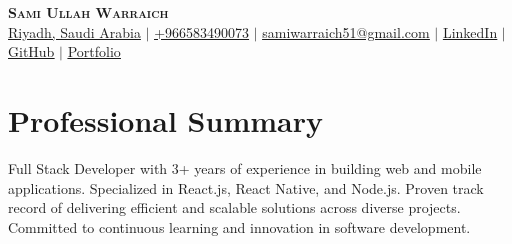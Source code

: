 \documentclass[letterpaper,11pt]{article}
\begin{document}

\begin{center}
    \textbf{\Huge \scshape Sami Ullah Warraich} \\ \vspace{1pt}
    \small 
    {\underline{Riyadh, Saudi Arabia}} $|$ 
    \href{https://wa.me/+966583490073}{\underline{+966583490073}} $|$ 
    \href{mailto:samiwarraich51@gmail.com}{\underline{samiwarraich51@gmail.com}} $|$ 
    \href{https://linkedin.com/in/samiwarra1ch}{\underline{LinkedIn}} $|$
    \href{https://github.com/samiwarraich}{\underline{GitHub}} 
    $|$ \href{https://sami.warraich.co}{\underline{Portfolio}}
\end{center}



\section{Professional Summary}
    \begin{itemize}[leftmargin=0.15in, label={}]
    \small{\item{
     {Full Stack Developer with 3+ years of experience in building web and mobile applications. Specialized in React.js, React Native, and Node.js. Proven track record of delivering efficient and scalable solutions across diverse projects. Committed to continuous learning and innovation in software development.} 
    }}
 \end{itemize}




\end{document}
